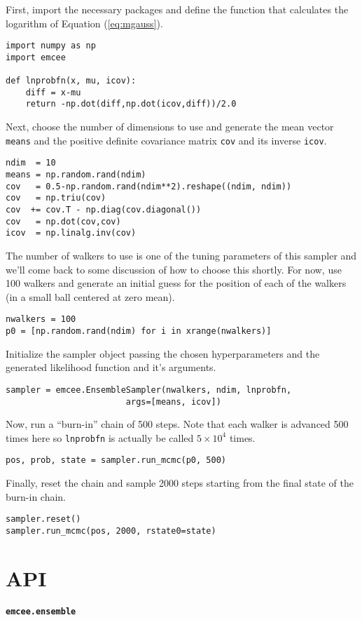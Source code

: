 \documentclass[12pt,preprint]{aastex}
\newcommand{\thisplain}{emcee}
\newcommand{\code}[1]{\texttt{#1}}
\newcommand{\eq}[1]{Equation (\ref{eq:#1})}
\begin{document}
First, import the necessary packages and define the function that calculates
the logarithm of \eq{mgauss}.
\begin{lstlisting}
import numpy as np
import emcee

def lnprobfn(x, mu, icov):
    diff = x-mu
    return -np.dot(diff,np.dot(icov,diff))/2.0
\end{lstlisting}
Next, choose the number of dimensions to use and generate the mean vector
\code{means} and the positive definite covariance matrix \code{cov} and its
inverse \code{icov}.
\begin{lstlisting}
ndim  = 10
means = np.random.rand(ndim)
cov   = 0.5-np.random.rand(ndim**2).reshape((ndim, ndim))
cov   = np.triu(cov)
cov  += cov.T - np.diag(cov.diagonal())
cov   = np.dot(cov,cov)
icov  = np.linalg.inv(cov)
\end{lstlisting}
The number of walkers to use is one of the tuning parameters of this sampler
and we'll come back to some discussion of how to choose this shortly. For
now, use 100 walkers and generate an initial guess for the position of each
of the walkers (in a small ball centered at zero mean).
\begin{lstlisting}
nwalkers = 100
p0 = [np.random.rand(ndim) for i in xrange(nwalkers)]
\end{lstlisting}
Initialize the sampler object passing the chosen hyperparameters and the
generated likelihood function and it's arguments.
\begin{lstlisting}
sampler = emcee.EnsembleSampler(nwalkers, ndim, lnprobfn,
                        args=[means, icov])
\end{lstlisting}
Now, run a ``burn-in'' chain of 500 steps. Note that each walker is advanced
500 times here so \code{lnprobfn} is actually be called $5\times10^4$ times.
\begin{lstlisting}
pos, prob, state = sampler.run_mcmc(p0, 500)
\end{lstlisting}
Finally, reset the chain and sample 2000 steps starting from the final state
of the burn-in chain.
\begin{lstlisting}
sampler.reset()
sampler.run_mcmc(pos, 2000, rstate0=state)
\end{lstlisting}

\section{API}

\paragraph{\code{\thisplain.ensemble}}
\end{document}
